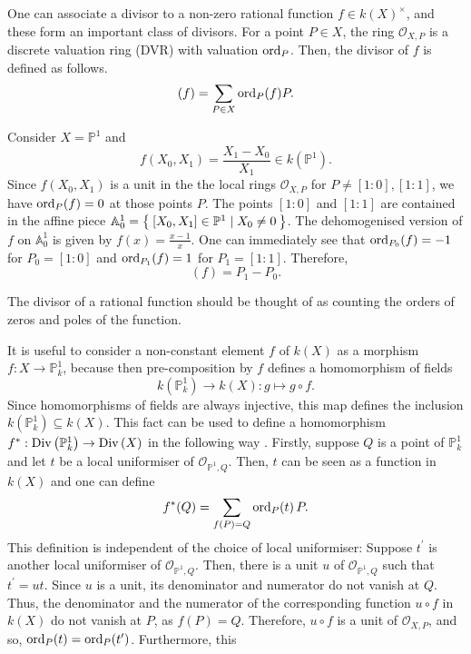 One can associate a divisor to a non-zero rational
function $f\in k(X)^{\times}$, and these form an important class of divisors.
For a point $P\in X$, the ring $\mathscr{O}_{X,P}$ is a discrete valuation ring
(DVR) with valuation $\operatorname{ord}_{P}$. Then, the divisor of $f$ is defined as follows.
\[
  (f) = \sum_{P\in X}\operatorname{ord}_{P}(f)P.
\]
\begin{ex}
  Consider $X=\mathbb{P}^{1}$ and
  \[f(X_{0}, X_{1})=\frac{X_{1}-X_{0}}{X_{1}}\in k(\mathbb{P}^{1}).\]
  Since $f(X_{0}, X_{1})$ is a unit in the the local rings
  $\mathscr{O}_{X,P}$ for $P\neq [1:0], [1:1]$, we have $\operatorname{ord}_{P}(f)=0$
  at those points $P$. The points $[1:0]$ and $[1:1]$ are contained in the
  affine piece $\mathbb{A}_{0}^{1}=\Set{[X_{0},X_{1}]\in\mathbb{P}^{1}\mid
    X_{0}\neq 0}$. The dehomogenised version of $f$ on $\mathbb{A}_{0}^{1}$ is
  given by $f(x)=\frac{x-1}x$. One can immediately see that
  $\operatorname{ord}_{P_{0}}(f)=-1$ for $P_{0}=[1:0]$ and $\operatorname{ord}_{P_{1}}(f)=1$ for
  $P_{1}=[1:1]$. Therefore,
  \[(f)=P_{1}-P_{0}.\]
\end{ex}
\begin{rem}
  The divisor of a rational function should be thought of as counting the
  orders of zeros and poles of the function.
\end{rem}
It is useful to consider a non-constant element $f$ of $k(X)$ as a morphism
$f:X\to\mathbb{P}^{1}_{k}$, because then pre-composition by $f$ defines a
homomorphism of fields
\[
  k\left(\mathbb{P}^1_k\right)\to k\left(X\right):g\mapsto g\circ f.
\]
Since homomorphisms of fields are always injective, this map
defines the inclusion $k\left(\mathbb{P}^{1}_{k}\right)\subseteq k\left(X\right)$.
This fact can be used to define a homomorphism
$f^{\ast}:\operatorname{Div}\left(\mathbb{P}^{1}_{k}\right)\to\operatorname{Div}\left(X\right)$ in the
following way \cite{hartshorne}. Firstly, suppose $Q$ is a point of
$\mathbb{P}^{1}_{k}$ and let $t$ be a local uniformiser of
$\mathscr{O}_{\mathbb{P}^{1},Q}$. Then, $t$ can be seen as a function in $k(X)$
and one can define
\[
  f^{\ast}(Q)=\sum_{f(P)=Q}\operatorname{ord}_{P}(t)\,P.
\]
This definition is independent of the choice of local uniformiser: Suppose
$t^{\prime}$ is another local uniformiser of $\mathscr{O}_{\mathbb{P}^{1},Q}$.
Then, there is a unit $u$ of $\mathscr{O}_{\mathbb{P}^1,Q}$ such that $t^{\prime}=ut$. 
Since $u$ is a unit, its denominator and numerator do not vanish at $Q$. Thus, 
the denominator and the numerator of the corresponding function $u\circ f$ in $k(X)$ 
do not vanish at $P$, as $f(P)=Q$. Therefore, $u\circ f$ is a unit of
$\mathscr{O}_{X,P}$, and so, $\operatorname{ord}_{P}(t)=\operatorname{ord}_{P}(t^{\prime})$. Furthermore, this
